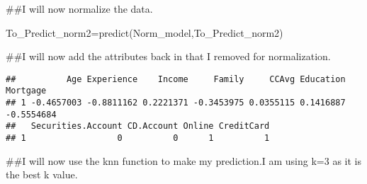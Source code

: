 \documentclass[
]{article}
\newenvironment{Shaded}{\begin{snugshade}}{\end{snugshade}}
\newcommand{\AttributeTok}[1]{\textcolor[rgb]{0.77,0.63,0.00}{#1}}
\newcommand{\DecValTok}[1]{\textcolor[rgb]{0.00,0.00,0.81}{#1}}
\newcommand{\FunctionTok}[1]{\textcolor[rgb]{0.00,0.00,0.00}{#1}}
\newcommand{\NormalTok}[1]{#1}
\newcommand{\OtherTok}[1]{\textcolor[rgb]{0.56,0.35,0.01}{#1}}
\newcommand{\SpecialCharTok}[1]{\textcolor[rgb]{0.00,0.00,0.00}{#1}}
\begin{document}
\#\#I will now normalize the data.

\begin{Shaded}
\begin{Highlighting}[]
\NormalTok{To\_Predict\_norm2}\OtherTok{=}\FunctionTok{predict}\NormalTok{(Norm\_model,To\_Predict\_norm2)}
\end{Highlighting}
\end{Shaded}

\#\#I will now add the attributes back in that I removed for
normalization.

\begin{Shaded}
\end{Shaded}

\begin{verbatim}
##          Age Experience    Income     Family     CCAvg Education   Mortgage
## 1 -0.4657003 -0.8811162 0.2221371 -0.3453975 0.0355115 0.1416887 -0.5554684
##   Securities.Account CD.Account Online CreditCard
## 1                  0          0      1          1
\end{verbatim}

\#\#I will now use the knn function to make my prediction.I am using k=3
as it is the best k value.

\begin{Shaded}
\end{Shaded}
\end{document}
